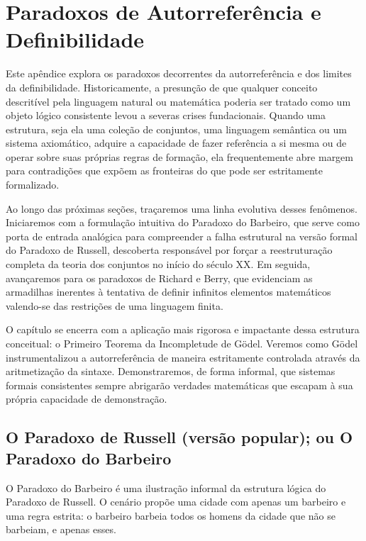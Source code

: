\chapter{Paradoxos de Autorreferência e Definibilidade}
\label{chap:apendiceAutorreferenciaDefinibilidade}

Este apêndice explora os paradoxos decorrentes da autorreferência e dos limites da definibilidade. Historicamente, a presunção de que qualquer conceito descritível pela linguagem natural ou matemática poderia ser tratado como um objeto lógico consistente levou a severas crises fundacionais. Quando uma estrutura, seja ela uma coleção de conjuntos, uma linguagem semântica ou um sistema axiomático, adquire a capacidade de fazer referência a si mesma ou de operar sobre suas próprias regras de formação, ela frequentemente abre margem para contradições que expõem as fronteiras do que pode ser estritamente formalizado.

Ao longo das próximas seções, traçaremos uma linha evolutiva desses fenômenos. Iniciaremos com a formulação intuitiva do Paradoxo do Barbeiro, que serve como porta de entrada analógica para compreender a falha estrutural na versão formal do Paradoxo de Russell, descoberta responsável por forçar a reestruturação completa da teoria dos conjuntos no início do século XX. Em seguida, avançaremos para os paradoxos de Richard e Berry, que evidenciam as armadilhas inerentes à tentativa de definir infinitos elementos matemáticos valendo-se das restrições de uma linguagem finita.

O capítulo se encerra com a aplicação mais rigorosa e impactante dessa estrutura conceitual: o Primeiro Teorema da Incompletude de Gödel. Veremos como Gödel instrumentalizou a autorreferência de maneira estritamente controlada através da aritmetização da sintaxe. Demonstraremos, de forma informal, que sistemas formais consistentes sempre abrigarão verdades matemáticas que escapam à sua própria capacidade de demonstração.

\section{O Paradoxo de Russell (versão popular); ou O Paradoxo do Barbeiro}

O Paradoxo do Barbeiro é uma ilustração informal da estrutura lógica do Paradoxo de Russell. O cenário propõe uma cidade com apenas um barbeiro e uma regra estrita: o barbeiro barbeia todos os homens da cidade que não se barbeiam, e apenas esses.

